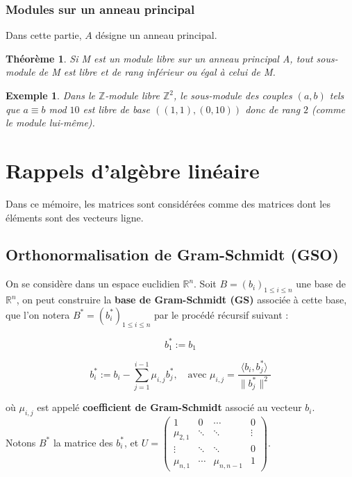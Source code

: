 \documentclass[a4paper,12pt]{report}  %
\theoremstyle{definitionstyle}
\theoremstyle{examplestyle}
\newtheorem{example}{Exemple}[chapter] %
\theoremstyle{remarkstyle}
\theoremstyle{propositionstyle}
\theoremstyle{theoremstyle}
\newtheorem{theoreme}{Théorème}[chapter]  %
\theoremstyle{proofstyle}
\begin{document}
	\subsection{Modules sur un anneau principal}
	Dans cette partie, $A$ désigne un anneau principal.
	
	\begin{theoreme}
	Si M est un module libre sur un anneau principal A, tout sous-module de M est libre et de rang inférieur ou égal à celui de M.
	\end{theoreme}


	\begin{example}
		Dans le $\mathbb{Z}$-module libre $\mathbb{Z}^2$, le sous-module des couples $(a, b)$ tels que $a \equiv b$ mod $10$ est libre de base $((1,1), (0, 10))$ donc de rang $2$ (comme le module lui-même).
	\end{example}
	
	
	
	\chapter{Rappels d'algèbre linéaire}
	
	Dans ce mémoire, les matrices sont considérées comme des matrices dont les éléments sont des vecteurs ligne.
	
	
	\section{Orthonormalisation de Gram-Schmidt (GSO)}
	
	On se considère dans un espace euclidien $\mathbb{R}^n$. Soit \( B = (b_i)_{1 \leq i \leq n} \) une base de \( \mathbb{R}^n \), on peut construire la \textbf{base de Gram-Schmidt (GS)} associée à cette base, que l'on notera \( B^* = (b^*_i)_{1 \leq i \leq n} \) par le procédé récursif suivant :
	
	
	$$b_1^* := b_1$$
	
	
	$$b_i^* := b_i - \sum_{j=1}^{i-1} \mu_{i,j} b_j^*, \quad \text{avec } \mu_{i,j} = \frac{\langle b_i, b_j^* \rangle}{\| b_j^* \|^2}$$
	
	où \( \mu_{i,j} \) est appelé \textbf{coefficient de Gram-Schmidt} associé au vecteur \( b_i \). \\
	
	Notons \( B^* \) la matrice des \( b_i^* \), et \( U = \left(\begin{array}{rrrr}
		1 & 0 & \cdots & 0\\
		\mu_{2,1} & \ddots & \ddots & \vdots\\
		\vdots & \ddots & \ddots & 0\\
		\mu_{n,1} & \cdots & \mu_{n,n-1} & 1
	\end{array}\right)\). 
\end{document}
